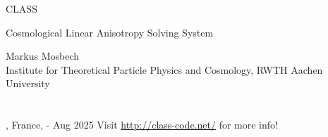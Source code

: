 
\begin{frame}

\begin{block}{
\begin{center}\Large CLASS\end{center}}
\begin{center}\small Cosmological Linear Anisotropy Solving System \end{center}
\end{block}

\scriptsize

\begin{center}
	Markus Mosbech\\
	Institute for Theoretical Particle Physics and Cosmology, RWTH Aachen University\\
	\mbox{}\\
	\mbox{}\\
	\location, France, \ecolefromdate{}-\ecoletodate{} Aug 2025
	\vfill
	Visit \url{http://class-code.net/} for more info!
\end{center}

\end{frame}
